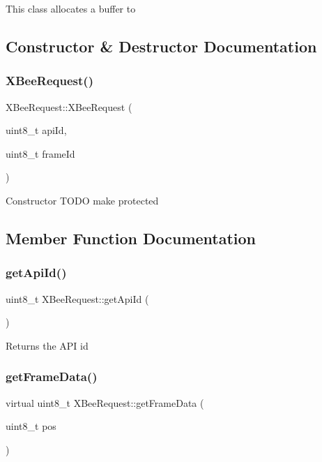 This class allocates a buffer to 

\subsection{Constructor \& Destructor Documentation}
\hypertarget{class_x_bee_request_af80fd559cab746ab8573087cddda71a2}{}\label{class_x_bee_request_af80fd559cab746ab8573087cddda71a2} 
\subsubsection{\texorpdfstring{X\+Bee\+Request()}{XBeeRequest()}}
{\footnotesize\ttfamily X\+Bee\+Request\+::\+X\+Bee\+Request (\begin{DoxyParamCaption}\item[{uint8\+\_\+t}]{api\+Id,  }\item[{uint8\+\_\+t}]{frame\+Id }\end{DoxyParamCaption})}

Constructor T\+O\+DO make protected 

\subsection{Member Function Documentation}
\hypertarget{class_x_bee_request_a746d0373c9fb6ed0ff8b7e04f5fb12c9}{}\label{class_x_bee_request_a746d0373c9fb6ed0ff8b7e04f5fb12c9} 
\subsubsection{\texorpdfstring{get\+Api\+Id()}{getApiId()}}
{\footnotesize\ttfamily uint8\+\_\+t X\+Bee\+Request\+::get\+Api\+Id (\begin{DoxyParamCaption}{ }\end{DoxyParamCaption})}

Returns the A\+PI id \hypertarget{class_x_bee_request_ad5b998cd95a570bdaa4d74c6c8790d94}{}\label{class_x_bee_request_ad5b998cd95a570bdaa4d74c6c8790d94} 
\subsubsection{\texorpdfstring{get\+Frame\+Data()}{getFrameData()}}
{\footnotesize\ttfamily virtual uint8\+\_\+t X\+Bee\+Request\+::get\+Frame\+Data (\begin{DoxyParamCaption}\item[{uint8\+\_\+t}]{pos }\end{DoxyParamCaption})\hspace{0.3cm}{\ttfamily [pure virtual]}}

